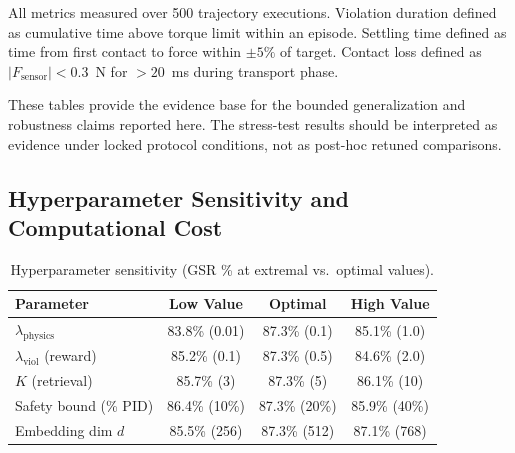 \documentclass[12pt]{article}
\begin{document}
\begin{table}[!htbp]
\centering
\caption{Safety-tail and contact-waveform metrics measured under the final protocol.}
\label{tab:safety_tail}
\small\setlength{\tabcolsep}{4pt}
\par\smallskip\footnotesize
All metrics measured over 500 trajectory executions. Violation duration defined as cumulative time above torque limit within an episode. Settling time defined as time from first contact to force within $\pm5\%$ of target. Contact loss defined as $|F_{\mathrm{sensor}}| < 0.3$~N for $>20$~ms during transport phase.
\end{table}

These tables provide the evidence base for the bounded generalization and robustness claims reported here. The stress-test results should be interpreted as evidence under locked protocol conditions, not as post-hoc retuned comparisons.

\FloatBarrier
\subsection{Hyperparameter Sensitivity and Computational Cost}
\FloatBarrier
\begin{table}[!htbp]
\centering
\caption{Hyperparameter sensitivity (GSR \% at extremal vs.\ optimal values).}
\label{tab:hyperparam}
\small\setlength{\tabcolsep}{2pt}
\begin{tabular}{@{}l c c c@{}}
\toprule
Parameter & Low Value & Optimal & High Value \\
\midrule
$\lambda_{\mathrm{physics}}$ & 83.8\% (0.01) & 87.3\% (0.1) & 85.1\% (1.0) \\
$\lambda_{\mathrm{viol}}$ (reward) & 85.2\% (0.1) & 87.3\% (0.5) & 84.6\% (2.0) \\
$K$ (retrieval) & 85.7\% (3) & 87.3\% (5) & 86.1\% (10) \\
Safety bound (\% PID) & 86.4\% (10\%) & 87.3\% (20\%) & 85.9\% (40\%) \\
Embedding dim $d$ & 85.5\% (256) & 87.3\% (512) & 87.1\% (768) \\
\bottomrule
\end{tabular}
\end{table}
\end{document}
